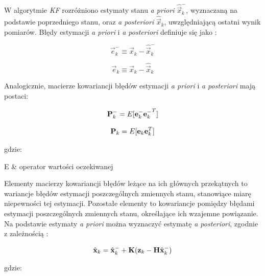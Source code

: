W algorytmie \textit{KF} rozróżniono estymaty stanu \textit{a priori} $\hat{\vec{x}}_k^-$, wyznaczaną na podstawie poprzedniego stanu, oraz \textit{a posteriori} $\hat{\vec{x}}_k$, uwzględniającą ostatni wynik pomiarów. Błędy estymacji \textit{a priori} i \textit{a posteriori} definiuje się jako \cite{Welch1995}:

\begin{equation}
\label{equ:Filtr_Kalmana_blad_a_priori}
	\vec{e}_k^- \equiv \vec{x}_k - \hat{\vec{x}}_k^-
\end{equation}

\begin{equation}
\label{equ:Filtr_Kalmana_a_posteriori}
	\vec{e}_k \equiv \vec{x}_k - \hat{\vec{x}}_k
\end{equation}

Analogicznie, macierze kowariancji błędów estymacji \textit{a priori} i \textit{a posteriori} mają postaci:

\begin{equation}
\label{equ:Filtr_Kalmana_macierz_kowariancji_a_priori}
	\mathbf{P}_k^- = E[\mathbf{e}_k^- {\mathbf{e}_k^-}^T]
\end{equation}

\begin{equation}
\label{equ:Filtr_Kalmana_macierz_kowariancji_a_posteriori}
	\mathbf{P}_k = E[\mathbf{e}_k \mathbf{e}_k^T]
\end{equation}

\noindent
gdzie:

\begin{conditions}
	E & operator wartości oczekiwanej \\
\end{conditions}

Elementy macierzy kowariancji błędów leżące na ich głównych przekątnych to wariancje błędów estymacji poszczególnych zmiennych stanu, stanowiące miarę niepewności tej estymacji. Pozostałe elementy to kowariancje pomiędzy błędami estymacji poszczególnych zmiennych stanu, określające ich wzajemne powiązanie. Na podstawie estymaty \textit{a priori} można wyznaczyć estymatę \textit{a posteriori}, zgodnie z zależnością \cite{Welch1995}:

\begin{equation}
\label{equ:Filtr_Kalmana_wyznaczenie_estymaty_a_posteriori}
	\hat{\vec{x}}_k = \hat{\vec{x}}_k^- + \matr{K}(\vec{z}_k - \matr{H}\hat{\vec{x}}_k^-)
\end{equation}

\noindent
gdzie:

